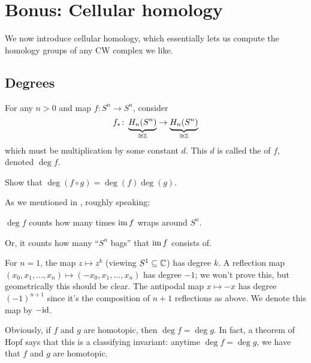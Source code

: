 \chapter{Bonus: Cellular homology}
\label{ch:cellular_homology}
We now introduce cellular homology, which essentially lets us compute
the homology groups of any CW complex we like.

\section{Degrees}
\label{sec:homology_degrees}
For any $n > 0$ and map $f \colon S^n \to S^n$, consider
\[ f_\ast \colon \underbrace{H_n(S^n)}_{\cong \mathbb Z} \to \underbrace{H_n(S^n)}_{\cong \mathbb Z} \]
which must be multiplication by some constant $d$.
This $d$ is called the  of $f$, denoted $\deg f$.
\begin{ques}
	Show that $\deg(f \circ g) = \deg(f) \deg(g)$.
\end{ques}

As we mentioned in , roughly speaking:
\begin{moral}
	$\deg f$ counts how many times $\operatorname{im} f$ wraps around $S^n$.
\end{moral}
Or, it counts how many ``$S^n$ bags'' that $\operatorname{im} f$ consists of.

\begin{example}
	[Degree]
	\listhack
	\begin{enumerate}[(a)]
		\ii For $n=1$, the map $z \mapsto z^k$ (viewing $S^1 \subseteq \mathbb C$)
		has degree $k$.
		\ii A reflection map $(x_0, x_1, \dots, x_n) \mapsto (-x_0, x_1, \dots, x_n)$
		has degree $-1$; we won't prove this, but geometrically this should be clear.
		\ii The antipodal map $x \mapsto -x$ has degree $(-1)^{n+1}$
		since it's the composition of $n+1$ reflections as above.
		We denote this map by $-\mathrm{id}$.
	\end{enumerate}
\end{example}

Obviously, if $f$ and $g$ are homotopic, then $\deg f = \deg g$.
In fact, a theorem of Hopf says that this is a classifying invariant:
anytime $\deg f = \deg g$, we have that $f$ and $g$ are homotopic.

